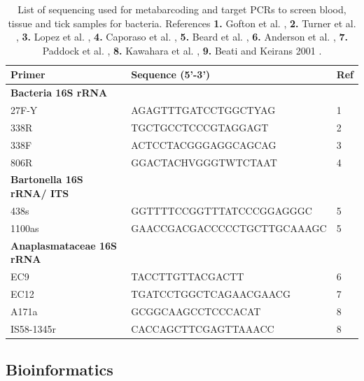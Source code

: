 \documentclass[a4paper, nobind]{templates/ociamthesis}
\begin{document}
\begin{table}

\caption[Primers used for bacteria detection in samples from ticks and wildlife.]{\label{tab:T32}List of sequencing used for metabarcoding and target PCRs to screen blood, tissue and tick samples for bacteria. References \textbf{1.} Gofton et al. \autocite*{goftonInhibitionEndosymbiontCandidatus2015}, \textbf{2.} Turner et al. \autocite*{turnerInvestigatingDeepPhylogenetic1999}, \textbf{3.} Lopez et al. \autocite*{lopezDesignEvaluationPCR2003}, \textbf{4.} Caporaso et al. \autocite*{caporasoGlobalPatterns16S2011}, \textbf{5.} Beard et al. \autocite*{beardBartonellaSppFeral2011}, \textbf{6.} Anderson et al. \autocite*{andersonEhrlichiaChaffeensisNew1991}, \textbf{7.} Paddock et al. \autocite*{paddockIsolationCharacterisationEhrlichia1997}, \textbf{8.} Kawahara et al. \autocite*{kawaharaUltrastructurePhylogeneticAnalysis2004}, \textbf{9.} Beati and Keirans 2001 \autocite*{beatiAnalysisSystematicRelationships2001}.}
\centering
\fontsize{8.5}{10.5}\selectfont
\begin{tabular}[t]{lll}
\toprule
Primer & Sequence (5'-3') & Ref\\
\midrule
\textbf{Bacteria 16S rRNA} & \textbf{} & \textbf{}\\
27F-Y & AGAGTTTGATCCTGGCTYAG & 1\\
338R & TGCTGCCTCCCGTAGGAGT & 2\\
338F & ACTCCTACGGGAGGCAGCAG & 3\\
806R & GGACTACHVGGGTWTCTAAT & 4\\
\textbf{Bartonella 16S rRNA/ ITS} & \textbf{} & \textbf{}\\
438s & GGTTTTCCGGTTTATCCCGGAGGGC & 5\\
1100as & GAACCGACGACCCCCTGCTTGCAAAGC & 5\\
\textbf{Anaplasmataceae 16S rRNA} & \textbf{} & \textbf{}\\
EC9 & TACCTTGTTACGACTT & 6\\
EC12 & TGATCCTGGCTCAGAACGAACG & 7\\
A171a & GCGGCAAGCCTCCCACAT & 8\\
IS58-1345r & CACCAGCTTCGAGTTAAACC & 8\\
\bottomrule
\end{tabular}
\end{table}

\hypertarget{bioinformatics}{%
\subsection{Bioinformatics}\label{bioinformatics}}
\end{document}
